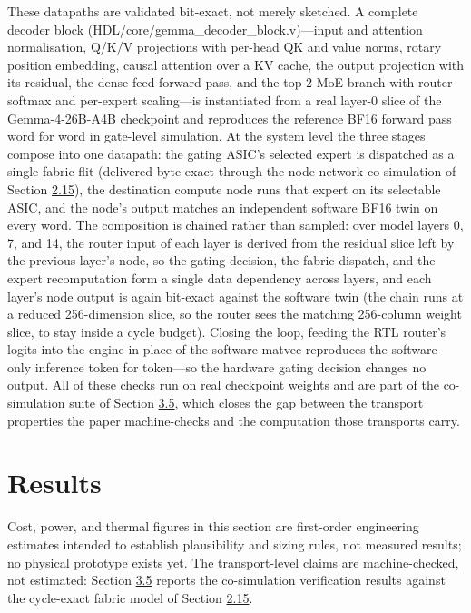 \documentclass[12pt,onecolumn]{article}
\begin{document}
These datapaths are validated bit-exact, not merely sketched. A complete decoder block (HDL/core/gemma\_decoder\_block.v)---input and attention normalisation, Q/K/V projections with per-head QK and value norms, rotary position embedding, causal attention over a KV cache, the output projection with its residual, the dense feed-forward pass, and the top-2 MoE branch with router softmax and per-expert scaling---is instantiated from a real layer-0 slice of the Gemma-4-26B-A4B checkpoint and reproduces the reference BF16 forward pass word for word in gate-level simulation. At the system level the three stages compose into one datapath: the gating ASIC's selected expert is dispatched as a single fabric flit (delivered byte-exact through the node-network co-simulation of Section \hyperref[sec:2.15]{2.15}), the destination compute node runs that expert on its selectable ASIC, and the node's output matches an independent software BF16 twin on every word. The composition is chained rather than sampled: over model layers 0, 7, and 14, the router input of each layer is derived from the residual slice left by the previous layer's node, so the gating decision, the fabric dispatch, and the expert recomputation form a single data dependency across layers, and each layer's node output is again bit-exact against the software twin (the chain runs at a reduced 256-dimension slice, so the router sees the matching 256-column weight slice, to stay inside a cycle budget). Closing the loop, feeding the RTL router's logits into the engine in place of the software matvec reproduces the software-only inference token for token---so the hardware gating decision changes no output. All of these checks run on real checkpoint weights and are part of the co-simulation suite of Section \hyperref[sec:3.5]{3.5}, which closes the gap between the transport properties the paper machine-checks and the computation those transports carry.

\section*{Results}\label{sec:results}

Cost, power, and thermal figures in this section are first-order engineering estimates intended to establish plausibility and sizing rules, not measured results; no physical prototype exists yet. The transport-level claims are machine-checked, not estimated: Section \hyperref[sec:3.5]{3.5} reports the co-simulation verification results against the cycle-exact fabric model of Section \hyperref[sec:2.15]{2.15}.
\end{document}
